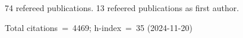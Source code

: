 74 refereed publications. 13 refeered publications as first author.

Total citations~=~4469; h-index~=~35 (2024-11-20)
